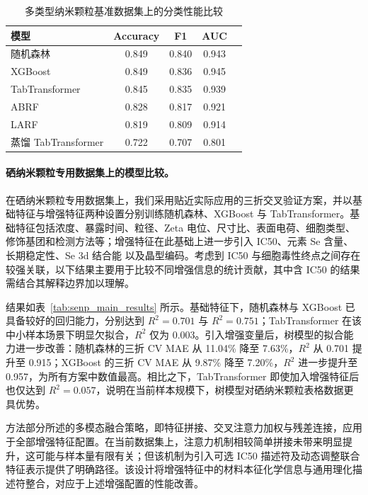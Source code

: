 \documentclass[letterpaper]{article}
\begin{document}
\begin{table}[htbp]
  \centering
  \caption{多类型纳米颗粒基准数据集上的分类性能比较}
  \label{tab:benchmark_classification}
  \begin{tabular}{lcccc}
    \hline
    模型 & Accuracy & F1 & AUC \\
    \hline
    随机森林 & 0.849 & 0.840 & 0.943 \\
    XGBoost & 0.849 & 0.836 & 0.945 \\
    TabTransformer & 0.845 & 0.835 & 0.939 \\
    ABRF & 0.828 & 0.817 & 0.921 \\
    LARF & 0.819 & 0.809 & 0.914 \\
    蒸馏 TabTransformer & 0.722 & 0.707 & 0.801 \\
    \hline
  \end{tabular}
\end{table}

\paragraph{硒纳米颗粒专用数据集上的模型比较。}
在硒纳米颗粒专用数据集上，我们采用贴近实际应用的三折交叉验证方案，并以基础特征与增强特征两种设置分别训练随机森林、XGBoost 与 TabTransformer。基础特征包括浓度、暴露时间、粒径、Zeta 电位、尺寸比、表面电荷、细胞类型、修饰基团和检测方法等；增强特征在此基础上进一步引入 IC50、元素 Se 含量、长期稳定性、Se 3d 结合能 以及晶型编码。考虑到 IC50 与细胞毒性终点之间存在较强关联，以下结果主要用于比较不同增强信息的统计贡献，其中含 IC50 的结果需结合其解释边界加以理解。

结果如表~\ref{tab:senp_main_results} 所示。基础特征下，随机森林与 XGBoost 已具备较好的回归能力，分别达到 $R^2=0.701$ 与 $R^2=0.751$；TabTransformer 在该中小样本场景下明显欠拟合，$R^2$ 仅为 0.003。引入增强变量后，树模型的拟合能力进一步改善：随机森林的三折 CV MAE 从 11.04\% 降至 7.63\%，$R^2$ 从 0.701 提升至 0.915；XGBoost 的三折 CV MAE 从 9.87\% 降至 7.20\%，$R^2$ 进一步提升至 0.957，为所有方案中数值最高。相比之下，TabTransformer 即使加入增强特征后也仅达到 $R^2=0.057$，说明在当前样本规模下，树模型对硒纳米颗粒表格数据更具优势。

方法部分所述的多模态融合策略，即特征拼接、交叉注意力加权与残差连接，应用于全部增强特征配置。在当前数据集上，注意力机制相较简单拼接未带来明显提升，这可能与样本量有限有关；但该机制为引入可选 IC50 描述符及动态调整联合特征表示提供了明确路径。该设计将增强特征中的材料本征化学信息与通用理化描述符整合，对应于上述增强配置的性能改善。
\end{document}
